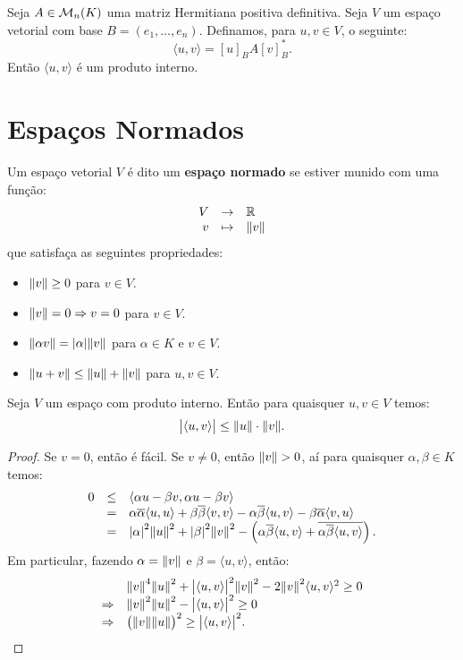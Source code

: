 \documentclass[11pt,twoside,a4paper]{book}
\begin{document}
\begin{proposicao}
Seja $A\in\mathcal{M}_{n}(K)$ uma matriz Hermitiana positiva definitiva. Seja $V$ um espaço vetorial com base $B=(e_1,\dots,e_n)$. Definamos, para $u,v\in V$, o seguinte:
\[
\langle u,v\rangle=[u]_BA[v]_B^*.
\]
Então $\langle u,v\rangle$ é um produto interno.
\end{proposicao}

\section{Espaços Normados}

\begin{definicao}
Um espaço vetorial $V$ é dito um \textbf{espaço normado} se estiver munido com uma função:
\[
\begin{array}{rcl}
V&\rightarrow&\mathbb{R}\\
v&\mapsto&\norm{v}
\end{array}
\]
que satisfaça as seguintes propriedades:
\begin{itemize}
\item $\norm{v}\geq 0$ para $v\in V$. 
\item $\norm{v}=0\Rightarrow v=0$ para $v\in V$.
\item $\norm{\alpha v}=\abs{\alpha}\norm{v}$ para $\alpha\in K$ e $v\in V$.
\item $\norm{u+v}\leq\norm{u}+\norm{v}$ para $u,v\in V$.
\end{itemize}
\end{definicao}

\begin{proposicao}
Seja $V$ um espaço com produto interno. Então para quaisquer $u,v\in V$ temos:
\[
\abs{\langle u,v\rangle}\leq\norm{u}\cdot\norm{v}.
\]
\end{proposicao}
\begin{proof}
Se $v=0$, então é fácil. Se $v\neq 0$, então $\norm{v}>0$, aí para quaisquer $\alpha,\beta\in K$ temos:
\[
\begin{array}{rcl}
0&\leq&\langle\alpha u-\beta v,\alpha u-\beta v\rangle\\
&=&\alpha\overline{\alpha}\langle u,u\rangle+\beta\overline{\beta}\langle v,v\rangle-\alpha\overline{\beta}\langle u,v\rangle-\beta\overline{\alpha}\langle v,u\rangle\\
&=&\abs{\alpha}^2\norm{u}^2+\abs{\beta}^2\norm{v}^2-\left(\alpha\overline{\beta}\langle u,v\rangle+\overline{\alpha\overline{\beta}\langle u,v\rangle}\right).
\end{array}
\]
Em particular, fazendo $\alpha=\norm{v}$ e $\beta=\langle u,v\rangle$, então:
\[
\begin{array}{rl}
&\norm{v}^4\norm{u}^2+\abs{\langle u,v\rangle}^2\norm{v}^2-2\norm{v}^2\langle u,v\rangle^2\geq0\\
\Rightarrow&\norm{v}^2\norm{u}^2-\abs{\langle u,v\rangle}^2\geq 0\\
\Rightarrow&\left(\norm{v}\norm{u}\right)^2\geq\abs{\langle u,v\rangle}^2.
\end{array}
\]
\end{proof}
\end{document}
